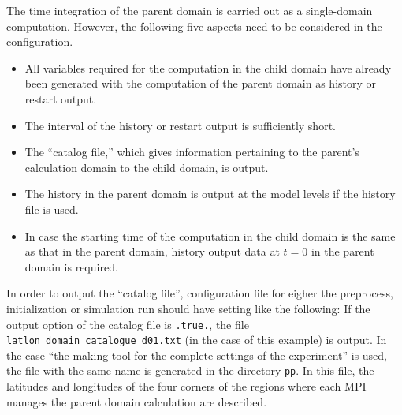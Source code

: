 The time integration of the parent domain is carried out as a single-domain computation.
However, the following five aspects need to be considered in the configuration.
\begin{itemize}
 \item All variables required for the computation in the child domain have already been generated with the computation of the parent domain as history or restart output.
 \item The interval of the history or restart output is sufficiently short.
 \item The ``catalog file,'' which gives information pertaining to the parent’s calculation domain
   to the child domain, is output.
 \item The history in the parent domain is output at the model levels if the history file is used.
 \item In case the starting time of the computation in the child domain is the same as that in the parent domain,
 history output data at $t=0$ in the parent domain is required.
\end{itemize}

In order to output the ``catalog file'', configuration file for eigher the preprocess, initialization or simulation run should have setting like the following:
If the output option of the catalog file is \verb|.true.|, the file \verb|latlon_domain_catalogue_d01.txt| (in the case of this example) is output.
In the case ``the making tool for the complete settings of the experiment'' is used, the file with the same name is generated in the directory \verb|pp|.
In this file, the latitudes and longitudes of the four corners of the regions where each MPI manages the parent domain calculation are described.

